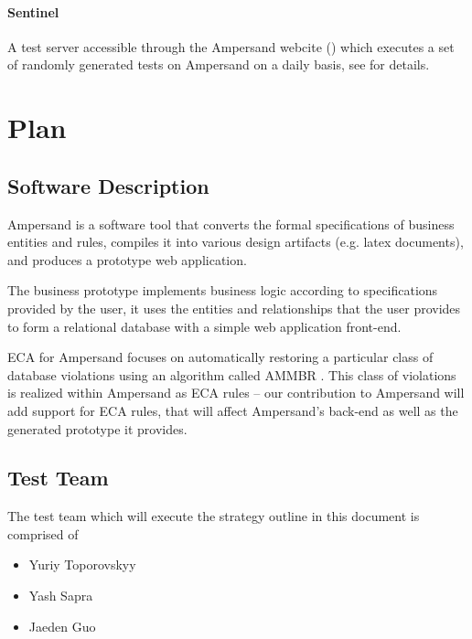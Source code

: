 \documentclass[12pt]{report}
\begin{document}
 \subsubsection*{Sentinel}
A test server accessible through the Ampersand webcite (\cite{sentinellink}) which executes a set of 
randomly generated tests on Ampersand on a daily basis, see \cite{sentinel} for details.

%
%

\chapter{Plan}\label{ch:Plan}

\section{Software Description}\label{sec:SoftwareDesc}
Ampersand is a software tool that converts the formal specifications of 
business entities and rules, compiles it into various design artifacts (e.g. 
latex documents), and produces a prototype web application.

The business prototype implements business logic according to specifications 
provided by the user, it uses the entities and relationships that the user 
provides to form a relational database with a simple web application front-end.

ECA for Ampersand focuses on automatically restoring a particular class of 
database violations using an algorithm called AMMBR \cite{amber}.  This class 
of violations is realized within Ampersand as ECA rules -- our contribution to 
Ampersand will add support for ECA rules, that will affect Ampersand's back-end 
as well as the generated prototype it provides.

\section{Test Team}\label{sec:TestTeam} 

The test team which will execute the strategy outline in this document is comprised of
\begin{itemize}
\item Yuriy Toporovskyy  
\item Yash Sapra        
\item Jaeden Guo         
\end{itemize}
\end{document}
